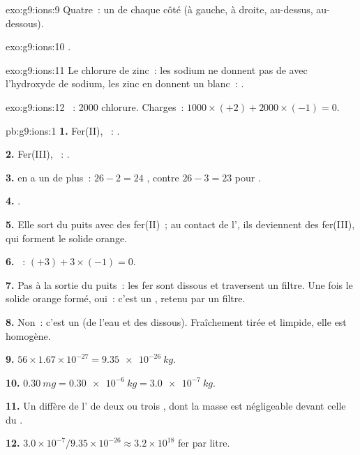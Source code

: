 \begin{solution}{exo:g9:ions:9}
Quatre~: un de chaque côté (à gauche, à droite, au-dessus, au-dessous).
\end{solution}

\begin{solution}{exo:g9:ions:10}
.
\end{solution}

\begin{solution}{exo:g9:ions:11}
Le chlorure de zinc~: les  sodium ne donnent pas de  avec
l'hydroxyde de sodium, les  zinc en donnent un blanc~:
.
\end{solution}

\begin{solution}{exo:g9:ions:12}
~: 2000  chlorure. Charges~: $1000 \times (+2) + 2000 \times
(-1) = 0$.
\end{solution}

\begin{solution}{pb:g9:ions:1}
\textbf{1.} Fer(II), ~: .

\textbf{2.} Fer(III), ~: .

\textbf{3.}  en a un de plus~: $26 - 2 = 24$ ,
contre $26 - 3 = 23$ pour .

\textbf{4.} .

\textbf{5.} Elle sort du puits avec des  fer(II)~; au contact de
l', ils deviennent des  fer(III), qui forment le solide orange.

\textbf{6.} ~: $(+3) + 3 \times (-1) = 0$.

\textbf{7.} Pas à la sortie du puits~: les  fer sont dissous et
traversent un filtre. Une fois le solide orange formé, oui~: c'est un
, retenu par un filtre.

\textbf{8.} Non~: c'est un  (de l'eau et des  dissous).
Fraîchement tirée et limpide, elle est homogène.

\textbf{9.} $56 \times 1.67 \times 10^{-27} = \qty{9.35e-26}{kg}$.

\textbf{10.} $\qty{0.30}{mg} = \qty{0.30e-6}{kg} = \qty{3.0e-7}{kg}$.

\textbf{11.} Un  diffère de l' de deux ou trois , dont
la masse est négligeable devant celle du .

\textbf{12.} $3.0 \times 10^{-7} / 9.35 \times 10^{-26} \approx 3.2
\times 10^{18}$  fer par litre.
\end{solution}
